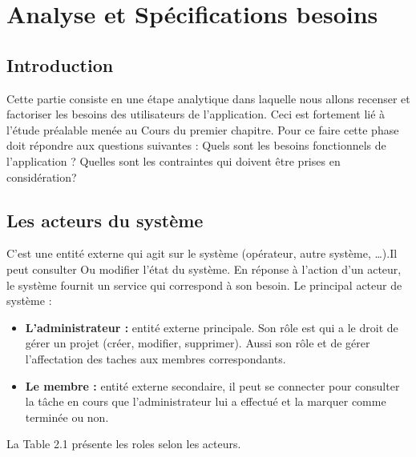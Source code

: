 \chapter{ Analyse et Sp\'{e}cifications besoins }
\section{Introduction}


Cette partie consiste en une \'{e}tape analytique dans laquelle nous allons
recenser et factoriser les besoins des utilisateurs de l'application. Ceci est
fortement li\'{e} \`{a} l'\'{e}tude pr\'{e}alable men\'{e}e au
Cours du premier chapitre.
Pour ce faire cette phase doit r\'{e}pondre aux questions suivantes :
Quels sont les besoins fonctionnels de l'application ?
Quelles sont les contraintes qui doivent \^{e}tre prises en consid\'{e}ration?

   \section{ Les acteurs du syst\`{e}me }
C'est une entit\'{e} externe qui agit sur le syst\`{e}me (op\'{e}rateur, autre syst\`{e}me,
\ldots{}).Il peut consulter
Ou modifier l'\'{e}tat du syst\`{e}me.
En r\'{e}ponse \`{a} l'action d'un acteur, le syst\`{e}me fournit un service qui
correspond \`{a} son besoin.
Le principal acteur de syst\`{e}me :
\begin{itemize}
\item{  \textbf{L'administrateur :} entit\'{e} externe principale. Son r\^{o}le est qui a le droit de
g\'{e}rer un projet (cr\'{e}er, modifier, supprimer).
Aussi son r\^{o}le et de g\'{e}rer l'affectation des taches aux membres
correspondants.
}

\item{ \textbf{Le membre : } entit\'{e} externe secondaire, il peut se connecter pour consulter la
t\^{a}che en cours que l'administrateur lui a effectu\'{e} et la marquer comme
termin\'{e}e ou non.
}
\end{itemize}

La Table 2.1 pr\'{e}sente les roles selon les acteurs.

